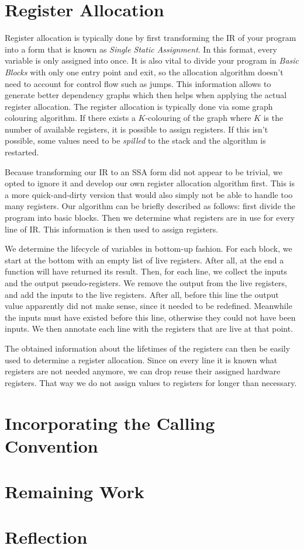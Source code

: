 \section{Register Allocation}

Register allocation is typically done by first transforming the IR of your program into a form that is known as \emph{Single Static Assignment}.
In this format, every variable is only assigned into once.
It is also vital to divide your program in \emph{Basic Blocks} with only one entry point and exit, so the allocation algorithm doesn't need to account for control flow such as jumps.
This information allows to generate better dependency graphs which then helps when applying the actual register allocation.
The register allocation is typically done via some graph colouring algorithm.
If there exists a $K$-colouring of the graph where $K$ is the number of available registers, it is possible to assign registers.
If this isn't possible, some values need to be \emph{spilled} to the stack and the algorithm is restarted.

Because transforming our IR to an SSA form did not appear to be trivial, we opted to ignore it and develop our own register allocation algorithm first.
This is a more quick-and-dirty version that would also simply not be able to handle too many registers.
Our algorithm can be briefly described as follows: first divide the program into basic blocks.
Then we determine what registers are in use for every line of IR\@.
This information is then used to assign registers.

We determine the lifecycle of variables in bottom-up fashion.
For each block, we start at the bottom with an empty list of live registers.
After all, at the end a function will have returned its result.
Then, for each line, we collect the inputs and the output pseudo-registers.
We remove the output from the live registers, and add the inputs to the live registers.
After all, before this line the output value apparently did not make sense, since it needed to be redefined.
Meanwhile the inputs must have existed before this line, otherwise they could not have been inputs.
We then annotate each line with the registers that are live at that point.

The obtained information about the lifetimes of the registers can then be easily used to determine a register allocation.
Since on every line it is known what registers are not needed anymore, we can drop reuse their assigned hardware registers.
That way we do not assign values to registers for longer than necessary.

\section{Incorporating the Calling Convention}


\section{Remaining Work}

\section{Reflection}

